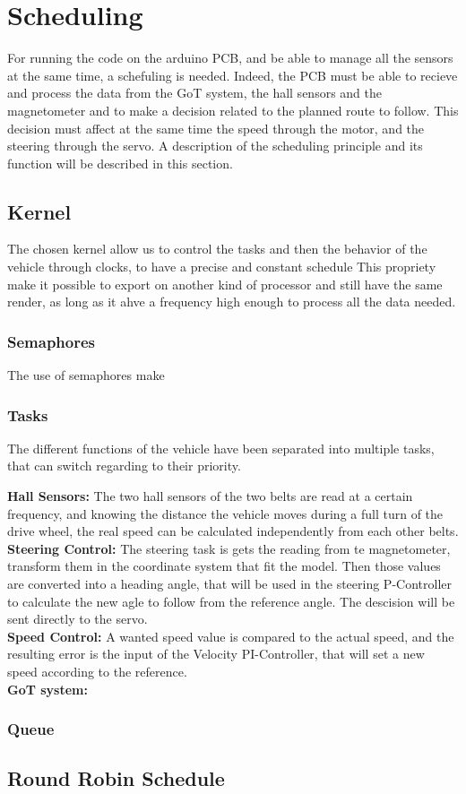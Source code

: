 \section{Scheduling}
For running the code on the arduino PCB, and be able to manage all the sensors at the same time, a schefuling is needed. Indeed, the PCB must be able to recieve and process the data from the GoT system, the hall sensors and the magnetometer and to make a decision related to the planned route to follow. This decision must affect at the same time the speed through the motor, and the steering through the servo.
A description of the scheduling principle and its function will be described in this section.


\subsection{Kernel}
The chosen kernel allow us to control the tasks and then the behavior of the vehicle through clocks, to have a precise and constant schedule This propriety make it possible to export on another kind of processor and still have the same render, as long as it ahve a frequency high enough to process all the data needed.


\subsubsection{Semaphores}
The use of semaphores make 
\\

\subsubsection{Tasks}
The different functions of the vehicle have been separated into multiple tasks, that can switch regarding to their priority. 

\textbf{Hall Sensors:}
The two hall sensors of the two belts are read at a certain frequency, and knowing the distance the vehicle moves during a full turn of the drive wheel, the real speed can be calculated independently from each other belts.\\

\textbf{Steering Control:}
The steering task is gets the reading from te magnetometer, transform them in the coordinate system that fit the model. Then those values are converted into a heading angle, that will be used in the steering P-Controller to calculate the new agle to follow from the reference angle. The descision will be sent directly to the servo.\\

\textbf{Speed Control:}
A wanted speed value is compared to the actual speed, and the resulting error is the input of the Velocity PI-Controller, that will set a new speed according to the reference.\\

\textbf{GoT system:}



\subsubsection{Queue}


\subsection{Round Robin Schedule}



